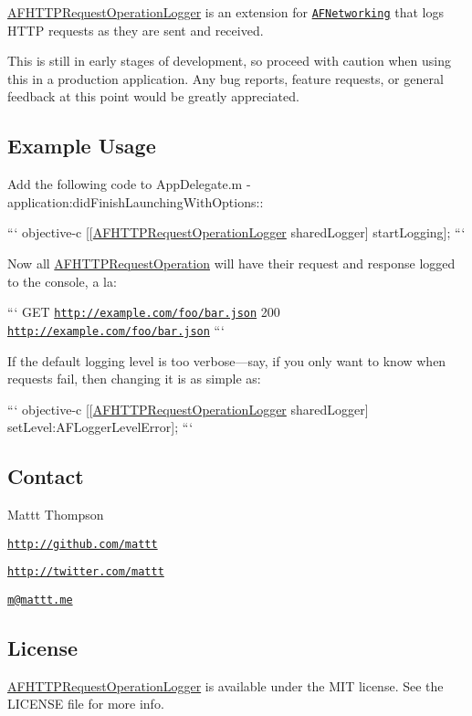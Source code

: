 \hyperlink{interface_a_f_h_t_t_p_request_operation_logger}{A\-F\-H\-T\-T\-P\-Request\-Operation\-Logger} is an extension for \href{http://github.com/AFNetworking/AFNetworking/}{\tt A\-F\-Networking} that logs H\-T\-T\-P requests as they are sent and received.

This is still in early stages of development, so proceed with caution when using this in a production application. Any bug reports, feature requests, or general feedback at this point would be greatly appreciated.

\subsection*{Example Usage}

Add the following code to {\ttfamily App\-Delegate.\-m -\/application\-:did\-Finish\-Launching\-With\-Options\-:}\-:

``` objective-\/c \mbox{[}\mbox{[}\hyperlink{interface_a_f_h_t_t_p_request_operation_logger}{A\-F\-H\-T\-T\-P\-Request\-Operation\-Logger} shared\-Logger\mbox{]} start\-Logging\mbox{]}; ```

Now all {\ttfamily \hyperlink{interface_a_f_h_t_t_p_request_operation}{A\-F\-H\-T\-T\-P\-Request\-Operation}} will have their request and response logged to the console, a la\-:

``` G\-E\-T \href{http://example.com/foo/bar.json}{\tt http\-://example.\-com/foo/bar.\-json} 200 \href{http://example.com/foo/bar.json}{\tt http\-://example.\-com/foo/bar.\-json} ```

If the default logging level is too verbose—say, if you only want to know when requests fail, then changing it is as simple as\-:

``` objective-\/c \mbox{[}\mbox{[}\hyperlink{interface_a_f_h_t_t_p_request_operation_logger}{A\-F\-H\-T\-T\-P\-Request\-Operation\-Logger} shared\-Logger\mbox{]} set\-Level\-:A\-F\-Logger\-Level\-Error\mbox{]}; ```

\subsection*{Contact}

Mattt Thompson


\begin{DoxyItemize}
\item \href{http://github.com/mattt}{\tt http\-://github.\-com/mattt}
\item \href{http://twitter.com/mattt}{\tt http\-://twitter.\-com/mattt}
\item \href{mailto:m@mattt.me}{\tt m@mattt.\-me}
\end{DoxyItemize}

\subsection*{License}

\hyperlink{interface_a_f_h_t_t_p_request_operation_logger}{A\-F\-H\-T\-T\-P\-Request\-Operation\-Logger} is available under the M\-I\-T license. See the L\-I\-C\-E\-N\-S\-E file for more info. 